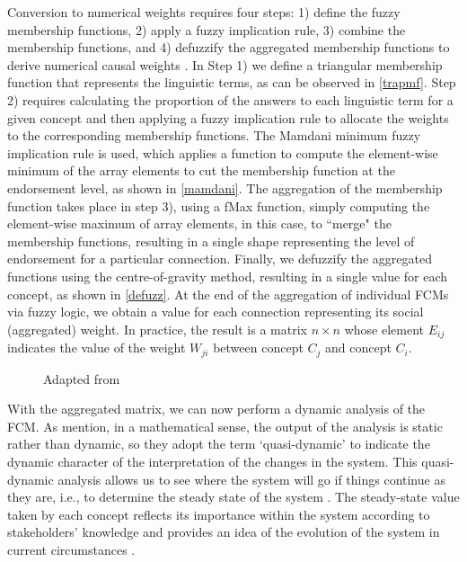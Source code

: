 Conversion to numerical weights requires four steps: 1) define the fuzzy membership functions, 2) apply a fuzzy implication rule, 3) combine the membership functions, and 4) defuzzify the aggregated membership functions to derive numerical causal weights \citep{mkhitaryan2022fcmpy}. In Step 1) we define a triangular membership function that represents the linguistic terms, as can be observed in \cref{trapmf}. Step 2) requires calculating the proportion of the answers to each linguistic term for a given concept and then applying a fuzzy implication rule to allocate the weights to the corresponding membership functions. The Mamdani minimum fuzzy implication rule is used, which applies a function to compute the element-wise minimum of the array elements to cut the membership function at the endorsement level, as shown in \cref{mamdani}. The aggregation of the membership function takes place in step 3), using a fMax function, simply computing the element-wise maximum of array elements, in this case, to ``merge" the membership functions, resulting in a single shape representing the level of endorsement for a particular connection. Finally, we defuzzify the aggregated functions using the centre-of-gravity method, resulting in a single value for each concept, as shown in \cref{defuzz}. At the end of the aggregation of individual FCMs via fuzzy logic, we obtain a value for each connection representing its social (aggregated) weight. In practice, the result is a matrix $n \times n$ whose element $ E_{ij} $ indicates the value of the weight $ W_{ji} $ between concept $ C_{j} $ and concept $ C_{i} $. 



\begin{figure}\centering
{}\hfill
{}\par 
{}
\caption*{Adapted from \cite{mkhitaryan2022fcmpy}}
\label{FCMpy}
\end{figure}


With the aggregated matrix, we can now perform a dynamic analysis of the FCM. As \cite{edwards2021building} mention, in a mathematical sense, the output of the analysis is static rather than dynamic, so they adopt the term ‘quasi-dynamic’ to indicate the dynamic character of the interpretation of the changes in the system. This quasi-dynamic analysis allows us to see where the system will go if things continue as they are, i.e., to determine the steady state of the system \citep{ozesmi2004ecological}. The steady-state value taken by each concept reflects its importance within the system according to stakeholders' knowledge and provides an idea of the evolution of the system in current circumstances \citep{lopolito2020combined}. 

